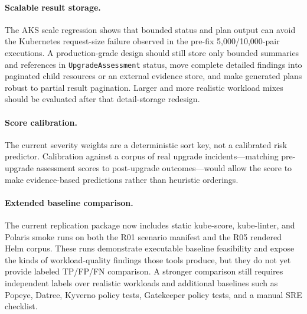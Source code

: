 \documentclass[10pt,journal]{IEEEtran}
\newcommand{\crd}[1]{\texttt{#1}}
\begin{document}
\paragraph{Scalable result storage.}
The AKS scale regression shows that bounded status and plan output can avoid the Kubernetes request-size failure observed in the pre-fix 5,000/10,000-pair executions. A production-grade design should still store only bounded summaries and references in \crd{UpgradeAssessment} status, move complete detailed findings into paginated child resources or an external evidence store, and make generated plans robust to partial result pagination. Larger and more realistic workload mixes should be evaluated after that detail-storage redesign.

\paragraph{Score calibration.}
The current severity weights are a deterministic sort key, not a calibrated risk predictor. Calibration against a corpus of real upgrade incidents---matching pre-upgrade assessment scores to post-upgrade outcomes---would allow the score to make evidence-based predictions rather than heuristic orderings.

\paragraph{Extended baseline comparison.}
The current replication package now includes static kube-score, kube-linter, and Polaris smoke runs on both the R01 scenario manifest and the R05 rendered Helm corpus. These runs demonstrate executable baseline feasibility and expose the kinds of workload-quality findings those tools produce, but they do not yet provide labeled TP/FP/FN comparison. A stronger comparison still requires independent labels over realistic workloads and additional baselines such as Popeye, Datree, Kyverno policy tests, Gatekeeper policy tests, and a manual SRE checklist.
\end{document}
